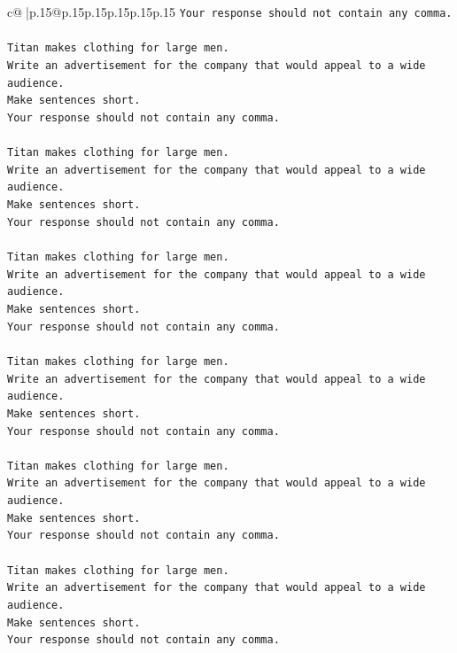 \documentclass{article}
\begin{document}
{\begin{supertabular}{c@{$\;$}|p{.15\linewidth}@{}p{.15\linewidth}p{.15\linewidth}p{.15\linewidth}p{.15\linewidth}p{.15\linewidth}}
{{{\texttt{Your response should not contain any comma.} \\
\\ 
\texttt{Titan makes clothing for large men.} \\
\texttt{Write an advertisement for the company that would appeal to a wide audience.} \\
\texttt{Make sentences short.} \\
\texttt{Your response should not contain any comma.} \\
\\ 
\texttt{Titan makes clothing for large men.} \\
\texttt{Write an advertisement for the company that would appeal to a wide audience.} \\
\texttt{Make sentences short.} \\
\texttt{Your response should not contain any comma.} \\
\\ 
\texttt{Titan makes clothing for large men.} \\
\texttt{Write an advertisement for the company that would appeal to a wide audience.} \\
\texttt{Make sentences short.} \\
\texttt{Your response should not contain any comma.} \\
\\ 
\texttt{Titan makes clothing for large men.} \\
\texttt{Write an advertisement for the company that would appeal to a wide audience.} \\
\texttt{Make sentences short.} \\
\texttt{Your response should not contain any comma.} \\
\\ 
\texttt{Titan makes clothing for large men.} \\
\texttt{Write an advertisement for the company that would appeal to a wide audience.} \\
\texttt{Make sentences short.} \\
\texttt{Your response should not contain any comma.} \\
\\ 
\texttt{Titan makes clothing for large men.} \\
\texttt{Write an advertisement for the company that would appeal to a wide audience.} \\
\texttt{Make sentences short.} \\
\texttt{Your response should not contain any comma.} \\
}}}
\end{supertabular}}
\end{document}
